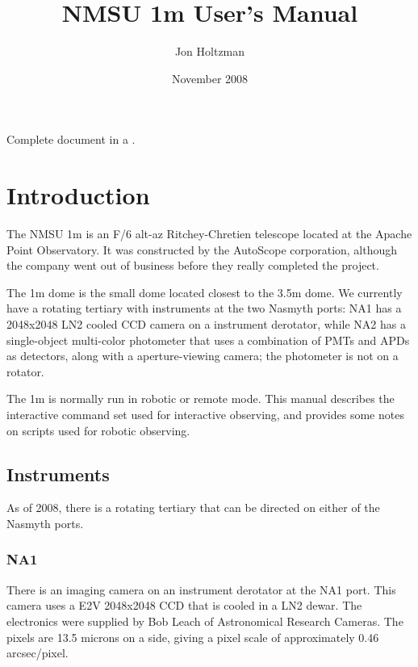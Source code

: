 \documentclass[10pt]{report}
\title{\Huge\bf NMSU 1m User's Manual}
\author{\Large
Jon Holtzman
}
\date{\Large November 2008}
\begin{document}
\setcounter{page}{1}

\maketitle

\begin{htmlonly}
Complete document in a
.
\end{htmlonly}


\tableofcontents

\clearpage

\setcounter{page}{1}


\chapter{Introduction}

The NMSU 1m is an F/6 alt-az Ritchey-Chretien telescope located at the Apache
Point Observatory. It was constructed by the AutoScope corporation, although
the company went out of business before they really completed the project.

The 1m dome is the small dome located closest to the 3.5m dome. We currently
have a rotating tertiary with instruments at the two Nasmyth ports: NA1 has
a 2048x2048 LN2 cooled CCD camera on a instrument derotator, while NA2 has
a single-object multi-color photometer that uses a combination of PMTs and 
APDs as detectors, along with a aperture-viewing camera; the photometer is
not on a rotator.

The 1m is normally run in robotic or remote mode. This manual describes the
interactive command set used for interactive observing, and provides some
notes on scripts used for robotic observing.

\section{Instruments}

As of 2008, there is a rotating tertiary that can be directed on either of the
Nasmyth ports.

\subsection{NA1}

There is an imaging camera on an instrument derotator at the NA1 port. This
camera uses a E2V 2048x2048 CCD that is cooled in a LN2 dewar. The electronics
were supplied by Bob Leach of Astronomical Research Cameras. The pixels are
13.5 microns on a side, giving a pixel scale of approximately 0.46 arcsec/pixel.
\end{document}
